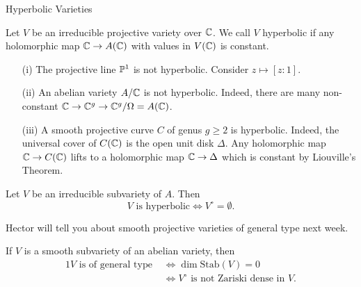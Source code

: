 \documentclass{beamer}
\begin{document}
\begin{frame}{Hyperbolic Varieties}
  \begin{definition}
    Let $V$ be an irreducible projective variety over ${\mathbb{C}}$.
      We call $V$ \alert{hyperbolic} if
      any holomorphic map ${\mathbb{C}} \rightarrow A({\mathbb{C}})$ with values in
      $V({\mathbb{C}})$ is
      constant.
  \end{definition}

  \begin{example}
    \begin{enumerate}
    \item [(i)]    The projective line ${\mathbb{P}}^1$ is \alert{not} hyperbolic. Consider
    $z\mapsto [z:1]$.
    \item[(ii)] An abelian variety $A/{\mathbb{C}}$ is \alert{not} hyperbolic.
      Indeed, there are many non-constant
      ${\mathbb{C}}\rightarrow {\mathbb{C}}^g\rightarrow {\mathbb{C}}^g/\Omega =A({\mathbb{C}})$. 
    \item[(iii)] A smooth projective curve $C$ of genus $g\ge 2$ is
      hyperbolic. Indeed, the universal cover of $C({\mathbb{C}})$ is the open
      unit disk $\Delta$.
      Any holomorphic map ${\mathbb{C}}\rightarrow C({\mathbb{C}})$ lifts to a
      holomorphic map ${\mathbb{C}}\rightarrow\Delta$ which is constant by
      Liouville's Theorem.
    \end{enumerate}
  \end{example}
\end{frame}

\begin{frame}
  \begin{theorem} Let $V$ be an irreducible subvariety of $A$. 
    Then
    $$\text{$V$ is hyperbolic}\Longleftrightarrow
    V^{\circ}=\emptyset. $$
  \end{theorem}

  Hector will tell you about \alert{smooth projective varieties of
    general type} next week.

  If $V$ is a smooth subvariety of an abelian variety, then 
  \begin{alignat*}1
    V \text{ is of general type }&\Leftrightarrow\dim
    \mathrm{Stab}(V)=0 \\
    &\Leftrightarrow
    \text{$V^{\circ}$ is
      not Zariski dense in $V$.}
  \end{alignat*}
\end{frame}
\end{document}
